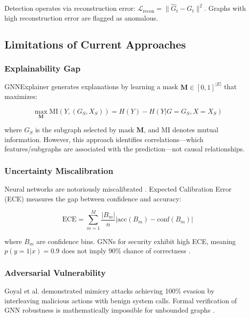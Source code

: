 \documentclass[conference]{IEEEtran}
\begin{document}
Detection operates via reconstruction error: $\mathcal{L}_{\text{recon}} = \|\hat{G}_t - G_t\|^2$. Graphs with high reconstruction error are flagged as anomalous.

\subsection{Limitations of Current Approaches}

\subsubsection{Explainability Gap}

GNNExplainer \cite{gnnexplainer} generates explanations by learning a mask $\mathbf{M} \in [0,1]^{|E|}$ that maximizes:

\begin{equation}
\max_{\mathbf{M}} \text{MI}(Y, (G_S, X_S)) = H(Y) - H(Y | G=G_S, X=X_S)
\end{equation}

where $G_S$ is the subgraph selected by mask $\mathbf{M}$, and MI denotes mutual information. However, this approach identifies correlations—which features/subgraphs are associated with the prediction—not causal relationships.

\subsubsection{Uncertainty Miscalibration}

Neural networks are notoriously miscalibrated \cite{calibration}. Expected Calibration Error (ECE) measures the gap between confidence and accuracy:

\begin{equation}
\text{ECE} = \sum_{m=1}^M \frac{|B_m|}{n} |\text{acc}(B_m) - \text{conf}(B_m)|
\end{equation}

where $B_m$ are confidence bins. GNNs for security exhibit high ECE, meaning $p(y=1|x) = 0.9$ does not imply 90\% chance of correctness \cite{gnn_calibration}.

\subsubsection{Adversarial Vulnerability}

Goyal et al. \cite{mimicry_ndss} demonstrated mimicry attacks achieving 100\% evasion by interleaving malicious actions with benign system calls. Formal verification of GNN robustness is mathematically impossible for unbounded graphs \cite{gnn_verification}.
\end{document}
